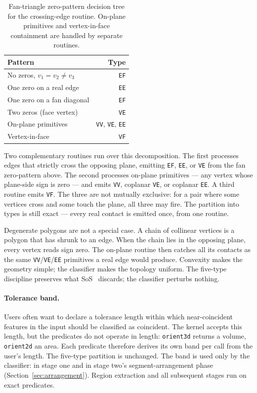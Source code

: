 \documentclass{egpubl}
\begin{document}
\begin{table}[t]
\centering
\caption{Fan-triangle zero-pattern decision tree for the crossing-edge routine. On-plane primitives and vertex-in-face containment are handled by separate routines.}
\label{tab:fan_zero_patterns}
\begin{tabular*}{\columnwidth}{@{\extracolsep{\fill}}lr@{}}
\toprule
Pattern & Type \\
\midrule
No zeros, $v_1 = v_2 \ne v_3$  & \texttt{EF} \\
One zero on a real edge        & \texttt{EE} \\
One zero on a fan diagonal     & \texttt{EF} \\
Two zeros (face vertex)        & \texttt{VE} \\
\midrule
On-plane primitives            & \texttt{VV}, \texttt{VE}, \texttt{EE} \\
Vertex-in-face                 & \texttt{VF} \\
\bottomrule
\end{tabular*}
\end{table}

Two complementary routines run over this decomposition. The first processes edges that strictly cross the opposing plane, emitting \texttt{EF}, \texttt{EE}, or \texttt{VE} from the fan zero-pattern above. The second processes on-plane primitives --- any vertex whose plane-side sign is zero --- and emits \texttt{VV}, coplanar \texttt{VE}, or coplanar \texttt{EE}. A third routine emits \texttt{VF}. The three are not mutually exclusive: for a pair where some vertices cross and some touch the plane, all three may fire. The partition into types is still exact --- every real contact is emitted once, from one routine.

Degenerate polygons are not a special case. A chain of collinear vertices is a polygon that has shrunk to an edge. When the chain lies in the opposing plane, every vertex reads sign zero. The on-plane routine then catches all its contacts as the same \texttt{VV}/\texttt{VE}/\texttt{EE} primitives a real edge would produce. Convexity makes the geometry simple; the classifier makes the topology uniform. The five-type discipline preserves what SoS~\cite{EdelsbrunnerMucke1990} discards; the classifier perturbs nothing.


\paragraph*{Tolerance band.}
Users often want to declare a tolerance length within which near-coincident features in the input should be classified as coincident. The kernel accepts this length, but the predicates do not operate in length: \texttt{orient3d} returns a volume, \texttt{orient2d} an area. Each predicate therefore derives its own band per call from the user's length. The five-type partition is unchanged. The band is used only by the classifier: in stage one and in stage two's segment-arrangement phase (Section~\ref{sec:arrangement}). Region extraction and all subsequent stages run on exact predicates.
\end{document}

